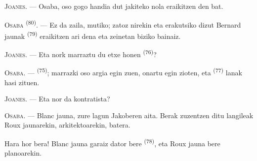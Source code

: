 %
%
%

\VUsaut{6.0mm}
\VUsaut{1.4mm}
\VUsaut{2.2mm}

\VUsaut{3.0mm}

\textsc{Joanes}. --- Osaba, oso gogo handia dut jakiteko nola eraikitzen den
 bat.

\textsc{Osaba} \textsuperscript{(80)}. --- Ez da zaila, mutiko; zatoz nirekin eta
erakutsiko dizut Bernard jaunak \textsuperscript{(79)} eraikitzen ari dena eta
zeinetan biziko bainaiz.

\textsc{Joanes}. --- Eta nork marraztu du etxe honen 
\textsuperscript{(76)}?

\textsc{Osaba}. ---  \textsuperscript{(75)}; marrazki oso
argia egin zuen, onartu egin zioten, eta 
\textsuperscript{(77)} lanak hasi zituen.

\textsc{Joanes}. --- Eta nor da kontratista?

\textsc{Osaba}. --- Blanc jauna, zure lagun Jakoberen aita. Berak zuzentzen ditu
langileak Roux jaunarekin, arkitektoarekin, batera.

Hara hor bera! Blanc jauna garaiz dator bere 
\textsuperscript{(78)}, eta Roux jauna bere planoarekin.

